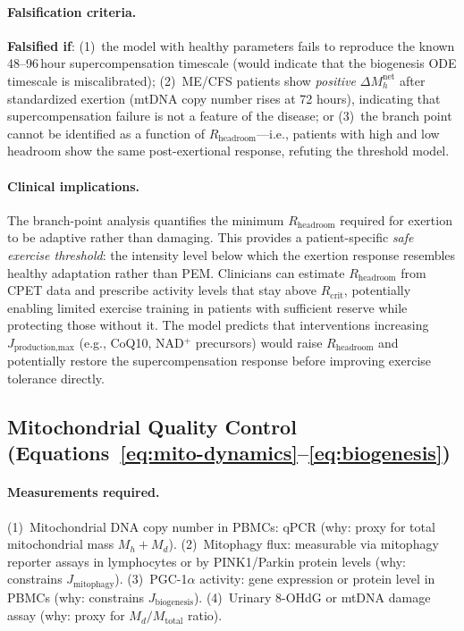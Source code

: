 \paragraph{Falsification criteria.}
\textbf{Falsified if}: (1)~the model with healthy parameters fails to reproduce the known 48--96\,hour supercompensation timescale (would indicate that the biogenesis ODE timescale is miscalibrated); (2)~ME/CFS patients show \emph{positive} $\Delta M_h^{\text{net}}$ after standardized exertion (mtDNA copy number rises at 72 hours), indicating that supercompensation failure is not a feature of the disease; or (3)~the branch point cannot be identified as a function of $R_{\text{headroom}}$---i.e., patients with high and low headroom show the same post-exertional response, refuting the threshold model.

\paragraph{Clinical implications.}
The branch-point analysis quantifies the minimum $R_{\text{headroom}}$ required for exertion to be adaptive rather than damaging. This provides a patient-specific \emph{safe exercise threshold}: the intensity level below which the exertion response resembles healthy adaptation rather than PEM. Clinicians can estimate $R_{\text{headroom}}$ from CPET data and prescribe activity levels that stay above $R_{\text{crit}}$, potentially enabling limited exercise training in patients with sufficient reserve while protecting those without it. The model predicts that interventions increasing $J_{\text{production,max}}$ (e.g., CoQ10, NAD$^+$ precursors) would raise $R_{\text{headroom}}$ and potentially restore the supercompensation response before improving exercise tolerance directly.

\subsection{Mitochondrial Quality Control (Equations~\ref{eq:mito-dynamics}--\ref{eq:biogenesis})}

\paragraph{Measurements required.}
(1)~Mitochondrial DNA copy number in PBMCs: qPCR (why: proxy for total mitochondrial mass $M_h + M_d$).
(2)~Mitophagy flux: measurable via mitophagy reporter assays in lymphocytes or by PINK1/Parkin protein levels (why: constrains $J_{\text{mitophagy}}$).
(3)~PGC-1$\alpha$ activity: gene expression or protein level in PBMCs (why: constrains $J_{\text{biogenesis}}$).
(4)~Urinary 8-OHdG or mtDNA damage assay (why: proxy for $M_d/M_{\text{total}}$ ratio).

